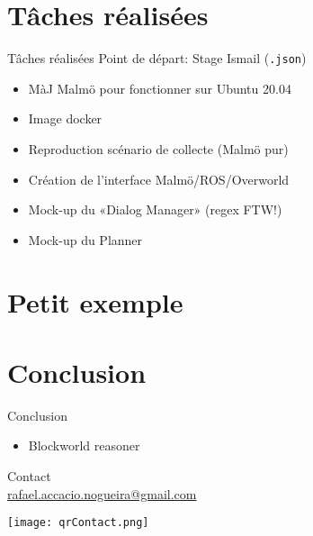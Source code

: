 \documentclass[aspectratio=169]{audition-beamer}
\begin{document}
\section{Tâches réalisées}
\begin{frame}{Tâches réalisées}
  \vfill
Point de départ: Stage Ismail (\texttt{.json})
  \vfill
\begin{itemize}
  \item MàJ Malmö pour fonctionner sur Ubuntu 20.04
  \item Image docker
  \item Reproduction scénario de collecte (Malmö pur)
  \item Création de l'interface Malmö/ROS/Overworld
  \item Mock-up du «Dialog Manager» (regex FTW!)
  \item Mock-up du Planner
\end{itemize}
\end{frame}

\section{Petit exemple}

\section{Conclusion}

\begin{frame}{Conclusion}
  \begin{itemize}
    \item<+-> Blockworld reasoner
  \end{itemize}
\end{frame}

\begin{frame}[plain]
  \centering
  \vfill
  \begin{minipage}[t]{.5\linewidth}
    \small
    \centering
    Contact\\
    \href{mailto:rafael.accacio.nogueira@gmail.com?subject=Audition IMT-Atlantique 2024}{rafael.accacio.nogueira@gmail.com}

    \texttt{[image: qrContact.png]}
  \end{minipage}
  \fi
\end{frame}

\appendix
\end{document}
